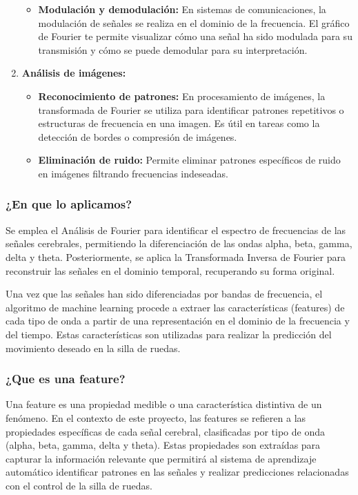 \documentclass{article}
\begin{document}
\begin{enumerate}
\begin{itemize}
        \item \textbf{Modulación y demodulación:} En sistemas de comunicaciones, la modulación de señales se realiza en el dominio de la frecuencia. El gráfico de Fourier te permite visualizar cómo una señal ha sido modulada para su transmisión y cómo se puede demodular para su interpretación.
    \end{itemize}
    \item \textbf{Análisis de imágenes:}
    \begin{itemize}
        \item \textbf{Reconocimiento de patrones:} En procesamiento de imágenes, la transformada de Fourier se utiliza para identificar patrones repetitivos o estructuras de frecuencia en una imagen. Es útil en tareas como la detección de bordes o compresión de imágenes.
    
        \item \textbf{Eliminación de ruido:} Permite eliminar patrones específicos de ruido en imágenes filtrando frecuencias indeseadas.
    \end{itemize}
\end{enumerate}

\subsubsection{¿En que lo aplicamos?}

Se emplea el Análisis de Fourier para identificar el espectro de frecuencias de las señales cerebrales, permitiendo la diferenciación de las ondas alpha, beta, gamma, delta y theta. Posteriormente, se aplica la Transformada Inversa de Fourier para reconstruir las señales en el dominio temporal, recuperando su forma original.

Una vez que las señales han sido diferenciadas por bandas de frecuencia, el algoritmo de machine learning procede a extraer las características (features) de cada tipo de onda a partir de una representación en el dominio de la frecuencia y del tiempo. Estas características son utilizadas para realizar la predicción del movimiento deseado en la silla de ruedas.

\subsubsection{¿Que es una feature?}

Una feature es una propiedad medible o una característica distintiva de un fenómeno. En el contexto de este proyecto, las features se refieren a las propiedades específicas de cada señal cerebral, clasificadas por tipo de onda (alpha, beta, gamma, delta y theta). Estas propiedades son extraídas para capturar la información relevante que permitirá al sistema de aprendizaje automático identificar patrones en las señales y realizar predicciones relacionadas con el control de la silla de ruedas.
\end{document}

